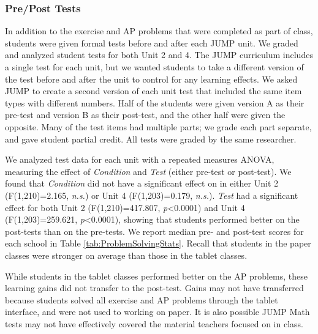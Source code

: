 \documentclass{sigchi}
\begin{document}
\subsubsection{Pre/Post Tests}
In addition to the exercise and AP problems that were completed as part of class, students were given formal tests before and after each JUMP unit. We graded and analyzed student tests for both Unit 2 and 4. The JUMP curriculum includes a single test for each unit, but we wanted students to take a different version of the test before and after the unit to control for any learning effects. We asked JUMP to create a second version of each unit test that included the same item types with different numbers. Half of the students were given version A as their pre-test and version B as their post-test, and the other half were given the opposite. Many of the test items had multiple parts; we grade each part separate, and gave student partial credit. All tests were graded by the same researcher.

We analyzed test data for each unit with a repeated measures ANOVA, measuring the effect of \emph{Condition} and \emph{Test} (either pre-test or post-test). We found that \emph{Condition} did not have a significant effect on in either Unit 2 (F(1,210)=2.165, \emph{n.s.}) or Unit 4 (F(1,203)=0.179, \emph{n.s.}). \emph{Test} had a significant effect for both Unit 2 (F(1,210)=417.807, \emph{p}\textless0.0001) and Unit 4 (F(1,203)=259.621, \emph{p}\textless0.0001), showing that students performed better on the post-tests than on the pre-tests. We report median pre- and post-test scores for each school in Table \ref{tab:ProblemSolvingStats}. Recall that students in the paper classes were stronger on average than those in the tablet classes.

While students in the tablet classes performed better on the AP problems, these learning gains did not transfer to the post-test. Gains may not have transferred because students solved all exercise and AP problems through the tablet interface, and were not used to working on paper. It is also possible JUMP Math tests may not have effectively covered the material teachers focused on in class.



%
\end{document}
